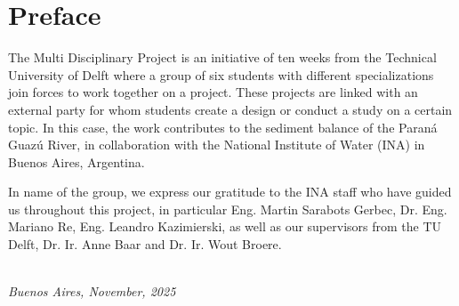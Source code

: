 \chapter*{Preface}

The Multi Disciplinary Project is an initiative of ten weeks from the Technical University of Delft where a group of six students with different specializations join forces to work together on a project. These projects are linked with an external party for whom students create a design or conduct a study on a certain topic. In this case, the work contributes to the sediment balance of the Paraná Guazú River, in collaboration with the National Institute of Water (INA) in Buenos Aires, Argentina. 

In name of the group, we express our gratitude to the INA staff who have guided us throughout this project, in particular Eng. Martin Sarabots Gerbec, Dr. Eng. Mariano Re, Eng. Leandro Kazimierski, as well as our supervisors from the TU Delft, Dr. Ir. Anne Baar and Dr. Ir. Wout Broere.

\begin{flushright}
{\makeatletter\itshape
    \@author \\
    Buenos Aires, November, 2025
\makeatother}
\end{flushright}
